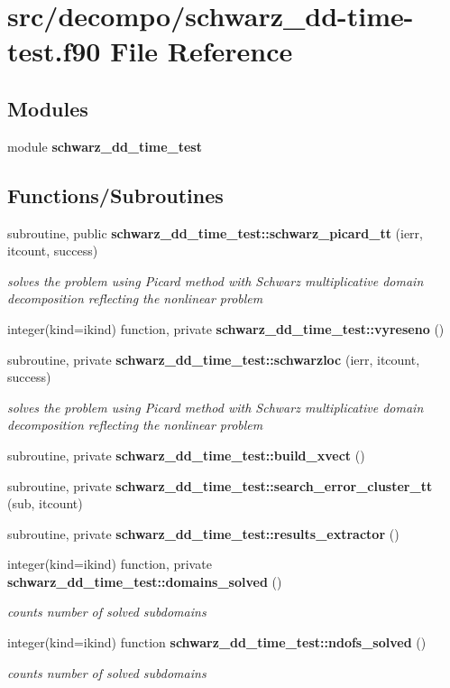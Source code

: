 \section{src/decompo/schwarz\+\_\+dd-\/time-\/test.f90 File Reference}
\label{schwarz__dd-time-test_8f90}
\subsection*{Modules}
\begin{DoxyCompactItemize}
\item 
module {\bf schwarz\+\_\+dd\+\_\+time\+\_\+test}
\end{DoxyCompactItemize}
\subsection*{Functions/\+Subroutines}
\begin{DoxyCompactItemize}
\item 
subroutine, public {\bf schwarz\+\_\+dd\+\_\+time\+\_\+test\+::schwarz\+\_\+picard\+\_\+tt} (ierr, itcount, success)
\begin{DoxyCompactList}\small\item\em solves the problem using Picard method with Schwarz multiplicative domain decomposition reflecting the nonlinear problem \end{DoxyCompactList}\item 
integer(kind=ikind) function, private {\bf schwarz\+\_\+dd\+\_\+time\+\_\+test\+::vyreseno} ()
\item 
subroutine, private {\bf schwarz\+\_\+dd\+\_\+time\+\_\+test\+::schwarzloc} (ierr, itcount, success)
\begin{DoxyCompactList}\small\item\em solves the problem using Picard method with Schwarz multiplicative domain decomposition reflecting the nonlinear problem \end{DoxyCompactList}\item 
subroutine, private {\bf schwarz\+\_\+dd\+\_\+time\+\_\+test\+::build\+\_\+xvect} ()
\item 
subroutine, private {\bf schwarz\+\_\+dd\+\_\+time\+\_\+test\+::search\+\_\+error\+\_\+cluster\+\_\+tt} (sub, itcount)
\item 
subroutine, private {\bf schwarz\+\_\+dd\+\_\+time\+\_\+test\+::results\+\_\+extractor} ()
\item 
integer(kind=ikind) function, private {\bf schwarz\+\_\+dd\+\_\+time\+\_\+test\+::domains\+\_\+solved} ()
\begin{DoxyCompactList}\small\item\em counts number of solved subdomains \end{DoxyCompactList}\item 
integer(kind=ikind) function {\bf schwarz\+\_\+dd\+\_\+time\+\_\+test\+::ndofs\+\_\+solved} ()
\begin{DoxyCompactList}\small\item\em counts number of solved subdomains \end{DoxyCompactList}\end{DoxyCompactItemize}
